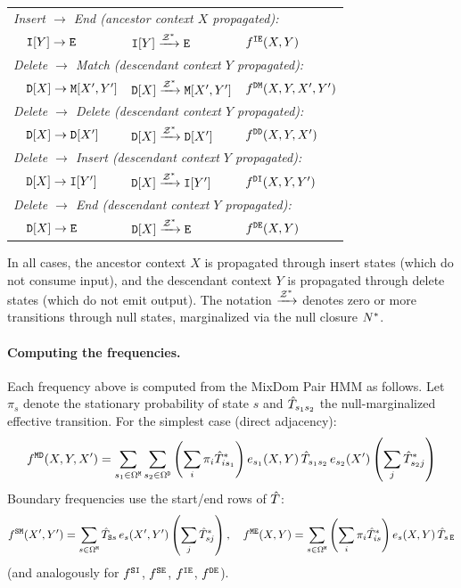 \begin{tabular}{llll}
\multicolumn{4}{l}{\emph{Insert $\to$ End (ancestor context $X$ propagated):}} \\
& ${\tt I}[Y] \to {\tt E}$ &
${\tt I}[Y] \xrightarrow{\mathcal{Z}^\ast} {\tt E}$ &
$f^{{\tt I}{\tt E}}(X,Y)$ \\
\hline
\multicolumn{4}{l}{\emph{Delete $\to$ Match (descendant context $Y$ propagated):}} \\
& ${\tt D}[X] \to {\tt M}[X',Y']$ &
${\tt D}[X] \xrightarrow{\mathcal{Z}^\ast} {\tt M}[X',Y']$ &
$f^{{\tt D}{\tt M}}(X,Y,X',Y')$ \\
\multicolumn{4}{l}{\emph{Delete $\to$ Delete (descendant context $Y$ propagated):}} \\
& ${\tt D}[X] \to {\tt D}[X']$ &
${\tt D}[X] \xrightarrow{\mathcal{Z}^\ast} {\tt D}[X']$ &
$f^{{\tt D}{\tt D}}(X,Y,X')$ \\
\multicolumn{4}{l}{\emph{Delete $\to$ Insert (descendant context $Y$ propagated):}} \\
& ${\tt D}[X] \to {\tt I}[Y']$ &
${\tt D}[X] \xrightarrow{\mathcal{Z}^\ast} {\tt I}[Y']$ &
$f^{{\tt D}{\tt I}}(X,Y,Y')$ \\
\multicolumn{4}{l}{\emph{Delete $\to$ End (descendant context $Y$ propagated):}} \\
& ${\tt D}[X] \to {\tt E}$ &
${\tt D}[X] \xrightarrow{\mathcal{Z}^\ast} {\tt E}$ &
$f^{{\tt D}{\tt E}}(X,Y)$
\end{tabular}

\medskip
In all cases, the ancestor context $X$ is propagated through insert states
(which do not consume input), and the descendant context $Y$ is propagated through delete states
(which do not emit output).
The notation $\xrightarrow{\mathcal{Z}^\ast}$ denotes zero or more transitions through null states,
marginalized via the null closure $N^\ast$.

\paragraph{Computing the frequencies.}
Each frequency above is computed from the MixDom Pair HMM as follows.
Let $\pi_s$ denote the stationary probability of state $s$
and $\hat{T}_{s_1 s_2}$ the null-marginalized effective transition.
For the simplest case (direct adjacency):
\[
f^{{\tt M}{\tt D}}(X,Y,X') = \sum_{s_1 \in \Omega^{{\tt M}}} \sum_{s_2 \in \Omega^{{\tt D}}}
\left(\sum_i \pi_i \hat{T}^\ast_{i s_1}\right)
e_{s_1}(X,Y)\, \hat{T}_{s_1 s_2}\, e_{s_2}(X')
\left(\sum_j \hat{T}^\ast_{s_2 j}\right)
\]
Boundary frequencies use the start/end rows of $\hat{T}$:
\[
f^{{\tt S}{\tt M}}(X',Y') = \sum_{s \in \Omega^{{\tt M}}}
\hat{T}_{{\tt S} s}\, e_s(X',Y')
\left(\sum_j \hat{T}^\ast_{s j}\right),
\quad
f^{{\tt M}{\tt E}}(X,Y) = \sum_{s \in \Omega^{{\tt M}}}
\left(\sum_i \pi_i \hat{T}^\ast_{i s}\right)
e_s(X,Y)\, \hat{T}_{s\,{\tt E}}
\]
(and analogously for $f^{{\tt S}{\tt I}}$, $f^{{\tt S}{\tt E}}$, $f^{{\tt I}{\tt E}}$, $f^{{\tt D}{\tt E}}$).

